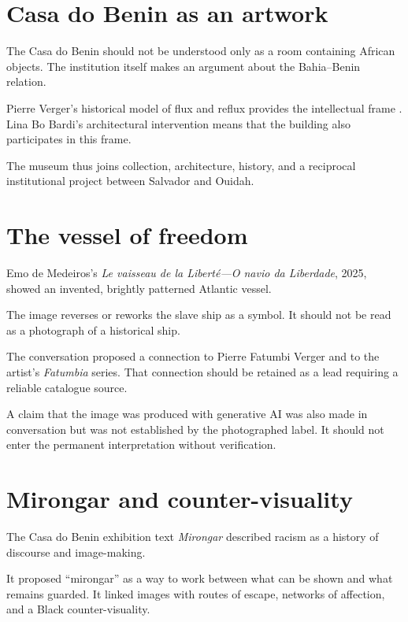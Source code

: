\section{Casa do Benin as an artwork}
\label{section-art-casa-benin}

The Casa do Benin should not be understood
only as a room containing African objects.
The institution itself makes an argument
about the Bahia--Benin relation.

Pierre Verger's historical model of flux
and reflux provides the intellectual frame
\cite{verger2021fluxo}.  Lina Bo Bardi's
architectural intervention means that the
building also participates in this frame.

The museum thus joins collection,
architecture, history, and a reciprocal
institutional project between Salvador and
Ouidah.

\section{The vessel of freedom}
\label{section-art-vessel-freedom}

Emo de Medeiros's
\emph{Le vaisseau de la Libert\'e---O navio
da Liberdade}, 2025, showed an invented,
brightly patterned Atlantic vessel.

The image reverses or reworks the slave
ship as a symbol.  It should not be read as
a photograph of a historical ship.

The conversation proposed a connection to
Pierre Fatumbi Verger and to the artist's
\emph{Fatumbia} series.  That connection
should be retained as a lead requiring a
reliable catalogue source.

A claim that the image was produced with
generative AI was also made in conversation
but was not established by the photographed
label.  It should not enter the permanent
interpretation without verification.

\section{Mirongar and counter-visuality}
\label{section-art-mirongar}

The Casa do Benin exhibition text
\emph{Mirongar} described racism as a
history of discourse and image-making.

It proposed ``mirongar'' as a way to work
between what can be shown and what remains
guarded.  It linked images with routes of
escape, networks of affection, and a Black
counter-visuality.

